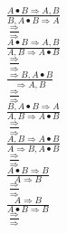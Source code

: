 \documentclass[11pt]{article}
\begin{document}
\begin{center}
\bigskip
\\$\frac{A\bullet B\Rightarrow A, B}{B, A\bullet B\Rightarrow A}$
\bigskip
\\$\frac{\Rightarrow }{\Rightarrow }$
\bigskip
\\$\frac{A\bullet B\Rightarrow A, B}{A, B\Rightarrow A\bullet B}$
\bigskip
\\$\frac{\Rightarrow }{\Rightarrow }$
\bigskip
\\$\frac{\Rightarrow B, A\bullet B}{\Rightarrow A, B}$
\bigskip
\\$\frac{\Rightarrow }{\Rightarrow }$
\bigskip
\\$\frac{B, A\bullet B\Rightarrow A}{A, B\Rightarrow A\bullet B}$
\bigskip
\\$\frac{\Rightarrow }{\Rightarrow }$
\bigskip
\\$\frac{A, B\Rightarrow A\bullet B}{A\Rightarrow B, A\bullet B}$
\bigskip
\\$\frac{\Rightarrow }{\Rightarrow }$
\bigskip
\\$\frac{A\bullet B\Rightarrow B}{A\Rightarrow B}$
\bigskip
\\$\frac{\Rightarrow }{\Rightarrow }$
\bigskip
\\$\frac{A\Rightarrow B}{A\bullet B\Rightarrow B}$
\bigskip
\\$\frac{\Rightarrow }{\Rightarrow }$
\bigskip
\\
\end{center}
\end{document}
